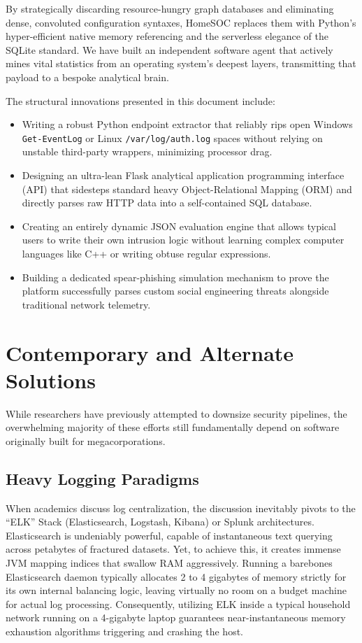 \documentclass[conference]{IEEEtran}
\begin{document}
By strategically discarding resource-hungry graph databases and eliminating dense, convoluted configuration syntaxes, HomeSOC replaces them with Python's hyper-efficient native memory referencing and the serverless elegance of the SQLite standard. We have built an independent software agent that actively mines vital statistics from an operating system's deepest layers, transmitting that payload to a bespoke analytical brain. 

The structural innovations presented in this document include:
\begin{itemize}
    \item Writing a robust Python endpoint extractor that reliably rips open Windows \verb|Get-EventLog| or Linux \verb|/var/log/auth.log| spaces without relying on unstable third-party wrappers, minimizing processor drag.
    \item Designing an ultra-lean Flask analytical application programming interface (API) that sidesteps standard heavy Object-Relational Mapping (ORM) and directly parses raw HTTP data into a self-contained SQL database.
    \item Creating an entirely dynamic JSON evaluation engine that allows typical users to write their own intrusion logic without learning complex computer languages like C++ or writing obtuse regular expressions.
    \item Building a dedicated spear-phishing simulation mechanism to prove the platform successfully parses custom social engineering threats alongside traditional network telemetry.
\end{itemize}

\section{Contemporary and Alternate Solutions}

While researchers have previously attempted to downsize security pipelines, the overwhelming majority of these efforts still fundamentally depend on software originally built for megacorporations. 

\subsection{Heavy Logging Paradigms}
When academics discuss log centralization, the discussion inevitably pivots to the ``ELK'' Stack (Elasticsearch, Logstash, Kibana) or Splunk architectures. Elasticsearch is undeniably powerful, capable of instantaneous text querying across petabytes of fractured datasets. Yet, to achieve this, it creates immense JVM mapping indices that swallow RAM aggressively. Running a barebones Elasticsearch daemon typically allocates 2 to 4 gigabytes of memory strictly for its own internal balancing logic, leaving virtually no room on a budget machine for actual log processing. Consequently, utilizing ELK inside a typical household network running on a 4-gigabyte laptop guarantees near-instantaneous memory exhaustion algorithms triggering and crashing the host. 
\end{document}
